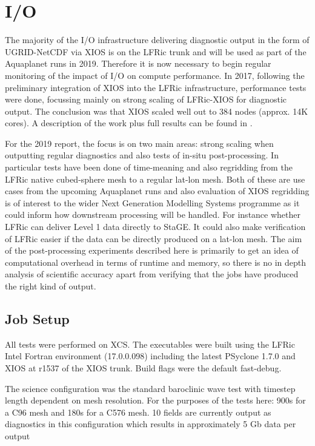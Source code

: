 \section{I/O}
The majority of the I/O infrastructure delivering diagnostic output in the form of UGRID-NetCDF via XIOS is on the LFRic trunk
and will be used as part of the Aquaplanet runs in 2019. Therefore it is now necessary to begin regular monitoring of the impact
of I/O on compute performance. In 2017, following the preliminary integration of XIOS into the LFRic infrastructure, performance
tests were done, focussing mainly on strong scaling of LFRic-XIOS for diagnostic output. The conclusion was that XIOS scaled well
out to 384 nodes (approx. 14K cores). A description of the work plus full results can be found in \cite{Adams2018}. 

For the 2019 report, the focus is on two main areas: strong scaling when outputting regular
diagnostics and also tests of in-situ post-processing. In particular tests have been done of time-meaning and also regridding 
from the LFRic native cubed-sphere mesh to a regular lat-lon mesh. Both of these are use cases from the upcoming Aquaplanet
runs and also evaluation of XIOS regridding is of interest to the wider Next Generation Modelling Systems programme as it
could inform how downstream processing will be handled. For instance whether LFRic can deliver Level 1 data directly to StaGE.
It could also make verification of LFRic easier if the data can be directly produced on a lat-lon mesh. The aim of the post-processing
experiments described here is primarily to get an idea of computational overhead in terms of runtime and memory, 
so there is no in depth analysis of scientific accuracy apart from verifying that the jobs have produced the right kind of output. 

\subsection{Job Setup}
All tests were performed on XCS. The executables were built using the LFRic Intel Fortran environment (17.0.0.098) 
including the latest PSyclone 1.7.0 and XIOS at r1537 of the XIOS trunk. Build flags were the default fast-debug.

The science configuration was the standard baroclinic wave test with timestep length dependent on mesh resolution. 
For the purposes of the tests here: 900s for a C96 mesh and 180s for a C576 mesh.
10 fields are currently output as diagnostics in this configuration which results in approximately 5 Gb data per
output

